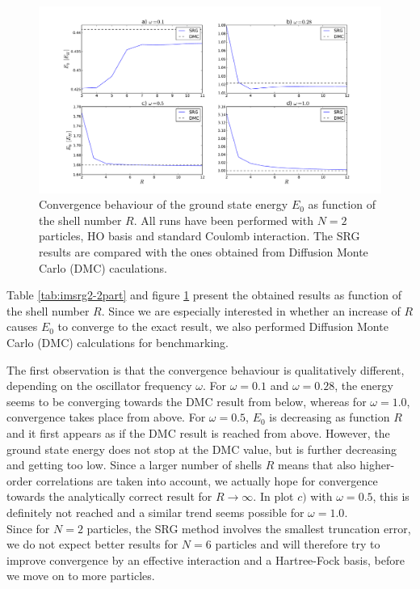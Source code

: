 \begin{figure}
\begin{center}
\includegraphics[scale=0.4]{../Plots/convergence00.pdf}
\end{center}
\caption{Convergence behaviour of the ground state energy $E_0$ as function of the shell number $R$. All runs have been performed with $N=2$ particles, HO basis and standard Coulomb interaction. The SRG results are compared with the ones obtained from Diffusion Monte Carlo (DMC) caculations.}
\label{fig:convergence00}
\end{figure}

Table \ref{tab:imsrg2-2part} and figure \ref{fig:convergence00} present the obtained results as function of the shell number $R$. Since we are especially interested in whether an increase of $R$ causes $E_0$ to converge to the exact result, we also
performed Diffusion Monte Carlo (DMC) calculations for benchmarking. 

The first observation is that the convergence behaviour is qualitatively different, depending on the oscillator frequency $\omega$. For $\omega=0.1$ and $\omega=0.28$, the energy seems to be converging towards the DMC result  from below, whereas for $\omega=1.0$, convergence takes place from above. For $\omega=0.5$, $E_0$ is decreasing as function $R$ and it first appears as if the DMC result is reached from above. However, the ground state energy does not stop at the DMC value, but is further decreasing and getting too low. Since a larger number of shells $R$ means that also higher-order correlations are taken into account, we actually hope for convergence towards the analytically correct result for $R\rightarrow\infty$. In plot $c)$ with $\omega=0.5$, this is definitely not reached and a similar trend seems possible for $\omega=1.0$.\\
Since for $N=2$ particles, the SRG method involves the smallest truncation error, we do not expect better results for $N=6$ particles and will therefore try to improve convergence by an effective interaction and a Hartree-Fock basis, before we move on to more particles.

